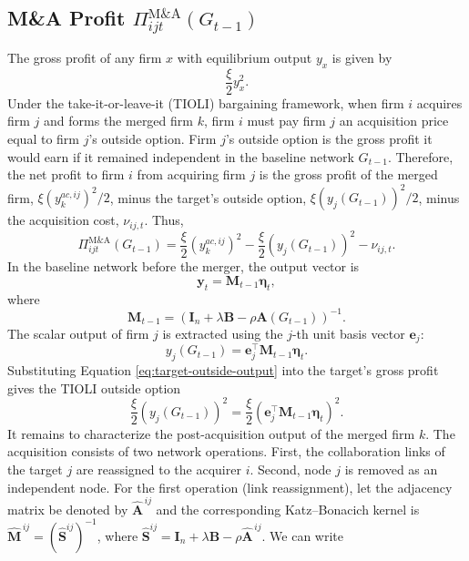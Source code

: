 \subsection{M\&A Profit $\Pi_{ijt}^{\text{M\&A}}(G_{t-1})$}
\label{sec:profit-mna}
The gross profit of any firm $x$ with equilibrium output $y_x$ is given by
\[
\frac{\xi}{2}y_x^2 .
\]
Under the take-it-or-leave-it (TIOLI) bargaining framework, when firm $i$ acquires
firm $j$ and forms the merged firm $k$, firm $i$ must pay firm $j$ an acquisition
price equal to firm $j$'s outside option. Firm $j$'s outside option is the gross
profit it would earn if it remained independent in the baseline network
$G_{t-1}$. Therefore, the net profit to firm $i$ from acquiring firm $j$ is the
gross profit of the merged firm, $\xi (y_k^{ac,ij})^2/2$, minus the target's outside
option, $\xi (y_j(G_{t-1}))^2/2$, minus the acquisition cost, $\nu_{ij,t}$. Thus,
\begin{equation}
\Pi_{ijt}^{\text{M\&A}}(G_{t-1})
=
\frac{\xi}{2}\left(y_k^{ac,ij}\right)^2
-
\frac{\xi}{2}\left(y_j(G_{t-1})\right)^2
-
\nu_{ij,t}.
\label{eq:mna-profit-start}
\end{equation}
In the baseline network before the merger, the output vector is
\[
\mathbf{y}_t
=
\mathbf{M}_{t-1}\bm{\eta}_t,
\]
where
\[
\mathbf{M}_{t-1}
=
\left(
\mathbf{I}_n+\lambda\mathbf{B}
-
\rho\mathbf{A}(G_{t-1})
\right)^{-1}.
\]
The scalar output of firm $j$ is extracted using the $j$-th unit basis vector
$\mathbf{e}_j$:
\begin{equation}
y_j(G_{t-1})
=
\mathbf{e}_j^\top\mathbf{M}_{t-1}\bm{\eta}_t .
\label{eq:target-outside-output}
\end{equation}
Substituting Equation \eqref{eq:target-outside-output} into the target's gross
profit gives the TIOLI outside option
\begin{equation}
\frac{\xi}{2}
\left(
y_j(G_{t-1})
\right)^2
=
\frac{\xi}{2}
\left(
\mathbf{e}_j^\top\mathbf{M}_{t-1}\bm{\eta}_t
\right)^2 .
\label{eq:target-outside-option}
\end{equation}
It remains to characterize the post-acquisition output of the merged firm $k$. The acquisition consists of two network operations. First, the collaboration links of the target $j$ are reassigned to the acquirer $i$. Second, node $j$ is removed as an independent node. For the first operation (link reassignment), let the adjacency matrix be denoted by $\widehat{\mathbf{A}}^{\,ij}$ and the corresponding Katz--Bonacich kernel is $\widehat{\mathbf{M}}^{\,ij}=(\widehat{\mathbf{S}}^{ij})^{-1}$, where $\widehat{\mathbf{S}}^{ij}=\mathbf{I}_n+\lambda\mathbf{B}-\rho\widehat{\mathbf{A}}^{\,ij}$. We can write
